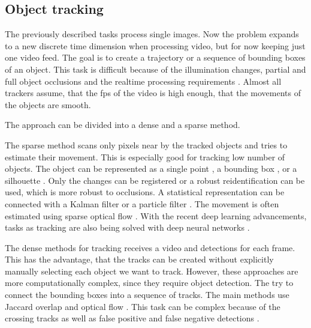\documentclass[a4paper,12pt,titlepage]{article}
\numberwithin{figure}{section}
\begin{document}
\subsection{Object tracking}

The previously described tasks process single images. Now the problem expands to a new discrete time dimension when processing video, but for now keeping just one video feed. The goal is to create a trajectory or a sequence of bounding boxes of an object. This task is difficult because of the illumination changes, partial and full object occlusions and the realtime processing requirements \cite{yilmaz2006object}. Almost all trackers assume, that the fps of the video is high enough, that the movements of the objects are smooth. 

The approach can be divided into a dense and a sparse method. 

The sparse method scans only pixels near by the tracked objects and tries to estimate their movement. This is especially good for tracking low number of objects. The object can be represented as a single point \cite{kale2015moving}, a bounding box \cite{comaniciu2003kernel, porikli2005multi, yilmaz2007object, elgammal2002background}, or a silhouette \cite{isard2001bramble}. Only the changes can be registered \cite{kale2015moving} or a robust reidentification \cite{veenman1998fast} can be used, which is more robust to occlusions. A statistical representation can be connected with a Kalman filter \cite{banerjee2008multi} or a particle filter \cite{zhong2012moving}. The movement is often estimated using sparse optical flow \cite{kale2015moving, mae1996object}. With the recent deep learning advancements, tasks as tracking are also being solved with deep neural networks \cite{bertinetto2016fully, held2016learning, gladh2016deep, gaidon2016virtual, lee2016globally}.

The dense methods for tracking receives a video and detections for each frame. This has the advantage, that the tracks can be created without explicitly manually selecting each object we want to track. However, these approaches are more computationally complex, since they require object detection. The try to connect the bounding boxes into a sequence of tracks. The main methods use Jaccard overlap \cite{tan2005introduction, benfold2011stable} and optical flow \cite{chen2011tracking}. This task can be complex because of the crossing tracks as well as false positive and false negative detections \cite{joshi2012survey, elgammal2002background}.
\end{document}
